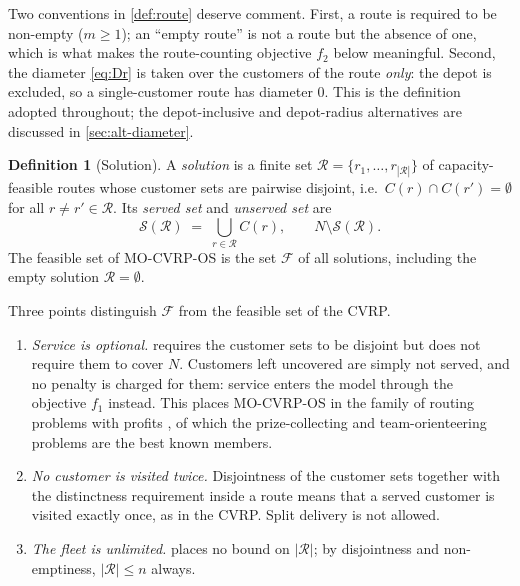 \documentclass[11pt,a4paper]{article}
\theoremstyle{definition}
\newtheorem{definition}{Definition}[section]
\theoremstyle{plain}
\newcommand{\Feas}{\mathcal{F}}
\newcommand{\Routes}{\mathcal{R}}
\newcommand{\Ground}{\mathcal{S}}
\newcommand{\Cust}{N}
\begin{document}
Two conventions in \cref{def:route} deserve comment.  First, a route is
required to be non-empty ($m \ge 1$); an ``empty route'' is not a route but the
absence of one, which is what makes the route-counting objective $f_2$ below
meaningful.  Second, the diameter \eqref{eq:Dr} is taken over the customers of
the route \emph{only}: the depot is excluded, so a single-customer route has
diameter $0$.  This is the definition adopted throughout; the depot-inclusive
and depot-radius alternatives are discussed in \cref{sec:alt-diameter}.

\begin{definition}[Solution]
\label{def:solution}
A \emph{solution} is a finite set $\Routes = \{r_1,\dots,r_{|\Routes|}\}$ of
capacity-feasible routes whose customer sets are pairwise disjoint, i.e.\
$C(r) \cap C(r') = \emptyset$ for all $r \ne r' \in \Routes$.  Its
\emph{served set} and \emph{unserved set} are
\begin{equation}
  \Ground(\Routes) \;=\; \bigcup_{r \in \Routes} C(r),
  \qquad
  \Cust \setminus \Ground(\Routes).
\end{equation}
The feasible set of \textup{\textsc{MO-CVRP-OS}} is the set $\Feas$ of all solutions,
including the empty solution $\Routes = \emptyset$.
\end{definition}

Three points distinguish $\Feas$ from the feasible set of the CVRP.

\begin{enumerate}[label=(\roman*),leftmargin=*]
\item \emph{Service is optional.}   requires the customer
  sets to be disjoint but does not require them to cover $\Cust$.  Customers
  left uncovered are simply not served, and no penalty is charged for them:
  service enters the model through the objective $f_1$ instead.  This places
  \textup{\textsc{MO-CVRP-OS}} in the family of routing problems with profits
  \cite{Archetti2014}, of which the prize-collecting and team-orienteering
  problems are the best known members.
\item \emph{No customer is visited twice.}  Disjointness of the customer sets
  together with the distinctness requirement inside a route means that a served
  customer is visited exactly once, as in the CVRP.  Split delivery is not
  allowed.
\item \emph{The fleet is unlimited.}   places no bound on
  $|\Routes|$; by disjointness and non-emptiness, $|\Routes| \le n$ always.
\end{enumerate}
\end{document}
